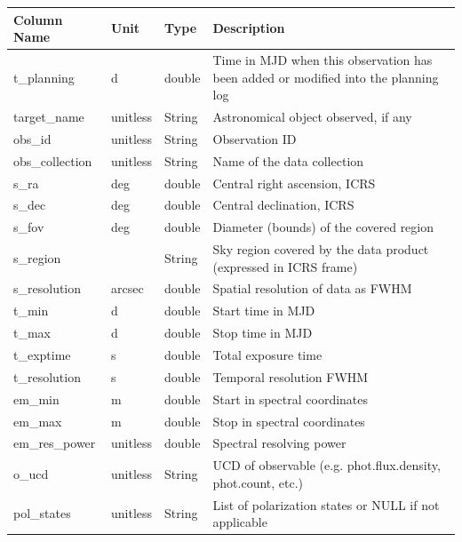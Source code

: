 \documentclass[11pt,a4paper]{ivoa}
\begin{document}
\begin{landscape}
\begin{table}
\begin{tabular}{ |l|l|l|l| }
\hline
\textbf{Column Name} & 
\textbf{Unit} & 
\textbf{Type} & 
\textbf{Description} \\
\hline
t\_planning & 
d & 
double & 
Time in MJD when this observation has been added or modified into the planning log \\
\hline
target\_name & 
unitless & 
String & 
Astronomical object observed, if any \\
\hline
obs\_id & 
unitless & 
String & 
Observation ID \\
\hline
obs\_collection & 
unitless & 
String & 
Name of the data collection \\
\hline
s\_ra & 
deg & 
double & 
Central right ascension, ICRS \\
\hline
s\_dec & 
deg  & 
double & 
Central declination, ICRS \\
\hline
s\_fov  & 
deg & 
double & 
Diameter (bounds) of the covered region \\
\hline
s\_region & 
& 
String & 
Sky region covered by the data product (expressed in ICRS frame) \\
\hline
s\_resolution & 
arcsec & 
double & 
Spatial resolution of data as FWHM \\
\hline
t\_min & 
d & 
double & 
Start time in MJD \\
\hline
t\_max & 
d & 
double & 
Stop time in MJD \\
\hline
t\_exptime & 
s & 
double & 
Total exposure time \\
\hline
t\_resolution & 
s & 
double & 
Temporal resolution FWHM \\
\hline
em\_min & 
m & 
double & 
Start in spectral coordinates \\
\hline
em\_max & 
m & 
double & 
Stop in spectral coordinates \\
\hline
em\_res\_power & 
unitless & 
double & 
Spectral resolving power \\
\hline
o\_ucd & 
unitless & 
String & 
UCD of observable (e.g. phot.flux.density, phot.count, etc.) \\
\hline
pol\_states & 
unitless & 
String & 
List of polarization states or NULL if not applicable \\

\end{tabular}
\end{table}
\end{landscape}
\end{document}
